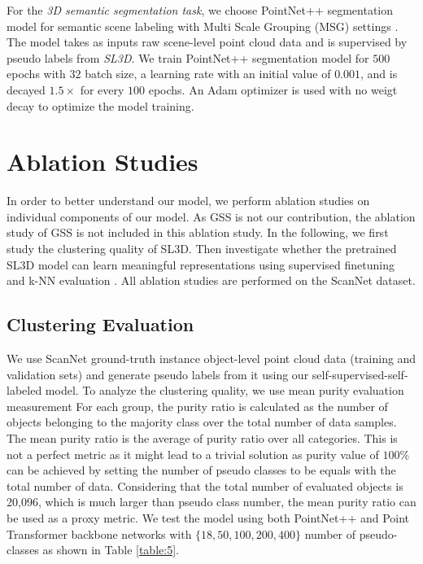 \documentclass{article}
\begin{document}
For the \textit{3D semantic segmentation task}, we choose PointNet++ segmentation model for semantic scene labeling with Multi Scale Grouping (MSG) settings \cite{qi2017pointnetplusplus}. The model takes as inputs raw scene-level point cloud data and is supervised by pseudo labels from \textit{SL3D}. We train PointNet++ segmentation model for $500$ epochs with $32$ batch size, a learning rate with an initial value of $0.001$, and is decayed $1.5\times$ for every $100$ epochs. An Adam optimizer is used with no weigt decay to optimize the model training.

\section{Ablation Studies}
\label{sec:ablation}

In order to better understand our model, we perform ablation studies on individual components of our model. As GSS \cite{ren2021wypr} is not our contribution, the ablation study of GSS is not included in this ablation study.
In the following, we first study the clustering quality of SL3D. Then investigate whether the pretrained SL3D model can learn meaningful representations using supervised finetuning and k-NN evaluation \cite{caron2018deep}. All ablation studies are performed on the ScanNet dataset.
\subsection{Clustering Evaluation} 

We use ScanNet ground-truth instance object-level point cloud data (training and validation sets) and generate pseudo labels from it using our self-supervised-self-labeled model. To analyze the clustering quality, we use mean purity evaluation measurement  For each group, the purity ratio is calculated as the number of objects belonging to the majority class over the total number of data samples.  The mean purity ratio is the average of purity ratio over all categories. This is not a perfect metric as it might lead to a trivial solution as purity value of $100\%$ can be achieved by setting the number of pseudo classes to be equals with the total number of data. Considering that the total number of evaluated objects is 20,096, which is much larger than pseudo class number, the mean purity ratio can be used as a proxy metric. We test the model using both PointNet++ and Point Transformer backbone networks with $\{18,50,100,200,400\}$ number of pseudo-classes as shown in Table \ref{table:5}.
\end{document}
